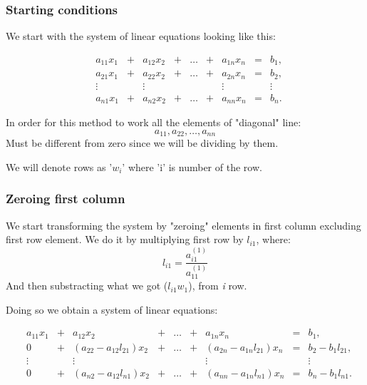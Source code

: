 \documentclass{report}
\begin{document}
\subsubsection{Starting conditions}
We start with the system of linear equations looking like this:

\[
\begin{matrix}

&a_{11}x_1 &{}+&a_{12}x_2&+&\dots&+&a_{1n}x_n &=&b_1,\\

&a_{21}x_1 &{}+&a_{22}x_2&+&\dots&+&a_{2n}x_n &=&b_2,\\

&\vdots    &&\vdots      & &     & &  \vdots  & &\vdots\\

&a_{n1}x_1&{}+&a_{n2}x_2&+&\dots &+&a_{nn}x_n&=&b_n.

\end{matrix}
\]

In order for this method to work all the elements of "diagonal" line:
\[ a_{11}, a_{22}, \dots, a_{nn} \]
Must be different from zero since we will be dividing by them.

We will denote rows as '$w_i$' where 'i' is number of the row.

\subsubsection{Zeroing first column}
We start transforming the system by "zeroing" elements in first column excluding first row element. We do it by multiplying first row by $l_{i1}$, where:
\[ l_{i1} = \frac{ a_{i1}^{(1)} }
{ a_{11}^{(1)} }  \]
And then substracting what we got ($ l_{i1}w_1 $), from \textit{i} row.

Doing so we obtain a system of linear equations:

\[
\begin{matrix}

&a_{11}x_1 &{}+&a_{12}x_2&+&\dots&+&a_{1n}x_n &=&b_1,\\

&0 &{}+&(a_{22} - a_{12}l_{21})x_2&{}+&\dots&{}+&(a_{2n} - a_{1n}l_{21})x_n &=&b_2 - b_{1}l_{21},\\

&\vdots    &&\vdots      & &     & &  \vdots  & &\vdots\\

&0&{}+&(a_{n2} - a_{12}l_{n1})x_2&+&\dots &+&(a_{nn} - a_{1n}l_{n1})x_n&=&b_n - b_{1}l_{n1}.

\end{matrix}
\]
\end{document}
